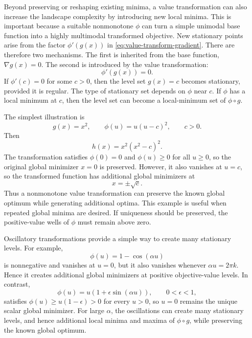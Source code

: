 \documentclass[11pt,a4paper]{article}
\theoremstyle{remark}
\theoremstyle{plain}
\begin{document}



Beyond preserving or reshaping existing minima, a value transformation can also
increase the landscape complexity by introducing new local minima. This is
important because a suitable nonmonotone \(\phi\) can turn a simple unimodal
base function into a highly multimodal transformed objective. New stationary
points arise from the factor \(\phi'(g(x))\) in
\eqref{eq:value-transform-gradient}. There are therefore two mechanisms. The first is inherited from the base
function, \(\nabla g(x)=0\). The second is introduced by the value
transformation:
\begin{equation}
	\phi'(g(x))=0.
	\label{eq:value-transform-new-stationary}
\end{equation}
If \(\phi'(c)=0\) for some \(c>0\), then the level set \(g(x)=c\) becomes
stationary, provided it is regular. The type of stationary set depends on
\(\phi\) near \(c\). If \(\phi\) has a local minimum at \(c\), then the level set
can become a local-minimum set of \(\phi\circ g\).

The simplest illustration is
\[
	g(x)=x^2,
	\qquad
	\phi(u)=u(u-c)^2,
	\qquad c>0.
\]
Then
\[
	h(x)=x^2(x^2-c)^2.
\]
The transformation satisfies \(\phi(0)=0\) and \(\phi(u)\ge0\) for all
\(u\ge0\), so the original global minimizer \(x=0\) is preserved. However, it
also vanishes at \(u=c\), so the transformed function has additional global
minimizers at
\[
	x=\pm\sqrt{c}.
\]
Thus a nonmonotone value transformation can preserve the known global optimum
while generating additional optima. This example is useful when repeated global
minima are desired. If uniqueness should be preserved, the positive-value wells
of \(\phi\) must remain above zero.

Oscillatory transformations provide a simple way to create many stationary
levels. For example,
\[
	\phi(u)=1-\cos(\alpha u)
\]
is nonnegative and vanishes at \(u=0\), but it also vanishes whenever
\(\alpha u=2\pi k\). Hence it creates additional global minimizers at positive
objective-value levels. In contrast,
\[
	\phi(u)=u\left(1+\epsilon\sin(\alpha u)\right),
	\qquad
	0<\epsilon<1,
\]
satisfies \(\phi(u)\ge u(1-\epsilon)>0\) for every \(u>0\), so \(u=0\) remains
the unique scalar global minimizer. For large \(\alpha\), the oscillations can
create many stationary levels, and hence additional local minima and maxima of
\(\phi\circ g\), while preserving the known global optimum.
\end{document}
